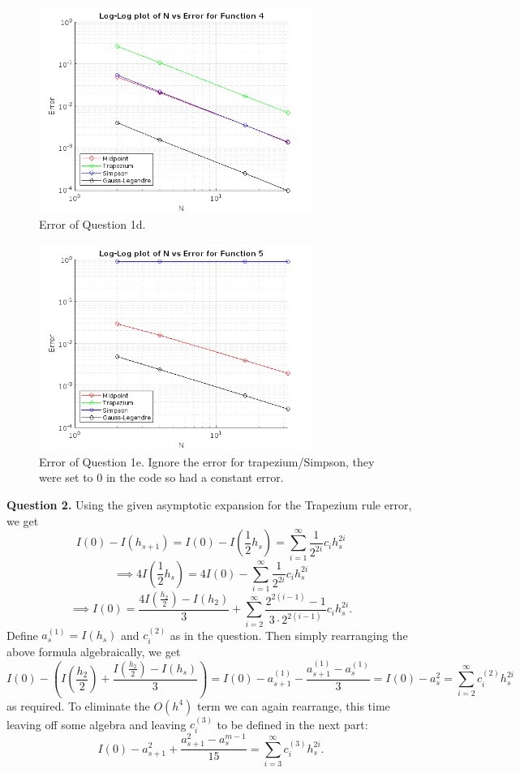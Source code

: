\documentclass[letterpaper, reqno,11pt]{article}
\begin{document}
\begin{figure}[htpb]
    \centering
    \includegraphics[width=0.8\textwidth]{q1d}
    \caption{Error of Question 1d.}
    \label{fig:q1d}
\end{figure}
\begin{figure}[htpb]
    \centering
    \includegraphics[width=0.8\textwidth]{q1e}
    \caption{Error of Question 1e. Ignore the error for trapezium/Simpson, they were set to 0 in the code so had a constant error.}
    \label{fig:q1e}
\end{figure}

{\medskip\noindent\bf Question 2.} Using the given asymptotic expansion for the Trapezium rule error, we get
\[
I(0)-I(h_{s+1})=I(0)-I(\frac{1}{2}h_s)=\sum_{i=1}^{\infty}\frac{1}{2^{2i}}c_ih_s^{2i}
\]
\[
\implies 4I(\frac{1}{2}h_s)=4I(0)-\sum_{i=1}^{\infty}\frac{1}{2^{2i}}c_ih_s^{2i}
\]
\[
\implies I(0)=\frac{4I(\frac{h_2}{2})-I(h_2)}{3}+ \sum_{i=2}^{\infty}\frac{2^{2(i-1)}-1}{3\cdot 2^{2(i-1)}}c_i h_s^{2i}
.\]
Define $a_s^{(1)}=I(h_s)$ and $c_i^{(2)}$ as in the question. Then simply rearranging the above formula algebraically, we get
\[
I(0)-\left(I(\frac{h_2}{2})+\frac{I(\frac{h_2}{2})-I(h_s)}{3}\right)=I(0)-a_{s+1}^{(1)}-\frac{a_{s+1}^{(1)}-a_s^{(1)}}{3}=I(0)-a_{s}^{2}=\sum_{i=2}^{\infty}c_{i}^{(2)}h_s^{2i}
\]
as required. To eliminate the $O(h^{4})$ term we can again rearrange, this time leaving off some algebra and leaving $c_i^{(3)}$ to be defined in the next part:
\[
I(0)-a_{s+1}^{2}+ \frac{a_{s+1}^{2}-a_s^{m-1}}{15}=\sum_{i=3}^{\infty}c_i^{(3)}h_s^{2i}
.\]
\end{document}
